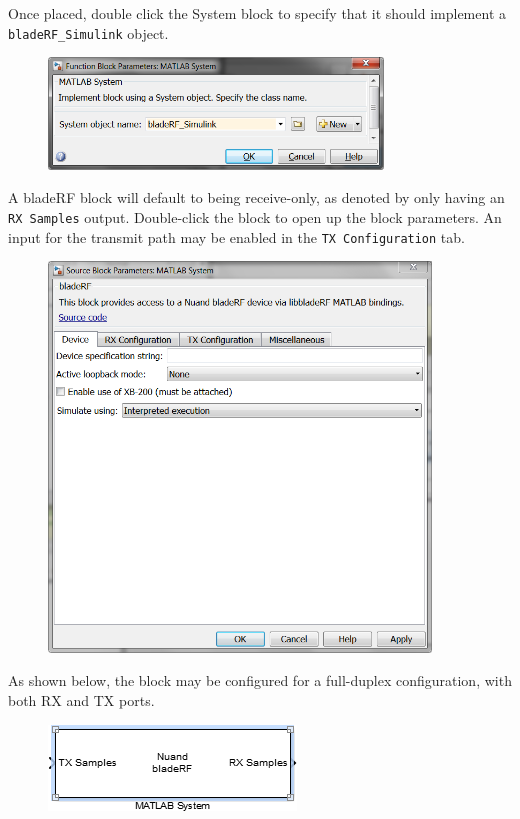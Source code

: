 {Once placed, double click the System block to specify that it should implement a \texttt{bladeRF\_Simulink} object.

\begin{figure}[h]
  \centering
  \includegraphics[width=3.5in]{images/windows/simulink/object.png}
\end{figure}

\newpage

A bladeRF block will default to being receive-only, as denoted by only having an \texttt{RX Samples} output. Double-click
the block to open up the block parameters. An input for the transmit path may be enabled in the \texttt{TX Configuration}
tab.

\begin{figure}[h]
  \centering
  \includegraphics[width=4in]{images/windows/simulink/block-properties.png}
\end{figure}

As shown below, the block may be configured for a full-duplex configuration, with both RX and TX ports.

\begin{figure}[h]
  \centering
  \includegraphics{images/windows/simulink/block.png}
\end{figure}

}
